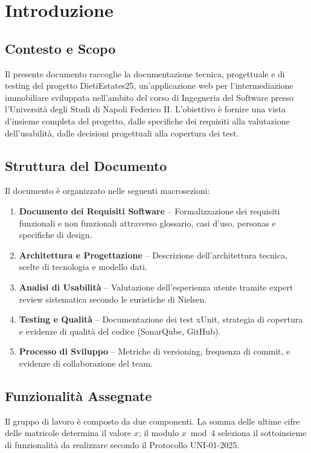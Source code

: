 \documentclass[a4paper,11pt]{article}
\begin{document}
\newpage
\section*{Introduzione}
\subsection*{Contesto e Scopo}
Il presente documento raccoglie la documentazione tecnica, progettuale e di testing del progetto DietiEstates25, un'applicazione web per l'intermediazione immobiliare sviluppata nell'ambito del corso di Ingegneria del Software presso l'Università degli Studi di Napoli Federico II. L'obiettivo è fornire una vista d'insieme completa del progetto, dalle specifiche dei requisiti alla valutazione dell'usabilità, dalle decisioni progettuali alla copertura dei test.

\subsection*{Struttura del Documento}
Il documento è organizzato nelle seguenti macrosezioni:
\begin{enumerate}
\item \textbf{Documento dei Requisiti Software} -- Formalizzazione dei requisiti funzionali e non funzionali attraverso glossario, casi d'uso, personas e specifiche di design.
\item \textbf{Architettura e Progettazione} -- Descrizione dell'architettura tecnica, scelte di tecnologia e modello dati.
\item \textbf{Analisi di Usabilità} -- Valutazione dell'esperienza utente tramite expert review sistematica secondo le euristiche di Nielsen.
\item \textbf{Testing e Qualità} -- Documentazione dei test xUnit, strategia di copertura e evidenze di qualità del codice (SonarQube, GitHub).
\item \textbf{Processo di Sviluppo} -- Metriche di versioning, frequenza di commit, e evidenze di collaborazione del team.
\end{enumerate}

\subsection*{Funzionalità Assegnate}
Il gruppo di lavoro è composto da due componenti. La somma delle ultime cifre delle matricole determina il valore $x$; il modulo $x \bmod 4$ seleziona il sottoinsieme di funzionalità da realizzare secondo il Protocollo UNI-01-2025.
\end{document}
